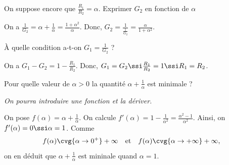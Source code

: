 \begin{enonce}
On suppose encore que $\frac{R_1}{R_2} = \alpha$. Exprimer $G_2$ en fonction de $\alpha$
\end{enonce}


\begin{corrige}
On a $\frac{1}{G_2} = \alpha + \frac{1}{\alpha} = \frac{1+\alpha^2}{\alpha}$. Donc, $G_2 = \frac{1}{\tfrac{1}{G_2}} = \frac{\alpha}{1+\alpha^2}$.
\end{corrige}





\begin{enonce}
  À quelle condition a-t-on $G_1 = \frac{1}{G_2}$ ?
\end{enonce}


\begin{corrige}
On a $G_1 - G_2 = 1-\frac{R_1}{R_2}$. Donc, $G_1=G_2 \ssi \frac{R_1}{R_2}=1 \ssi R_1 = R_2$.
\end{corrige}




\begin{enonce}
Pour quelle valeur de $\alpha>0$ la quantité $\alpha + \frac{1}{\alpha}$ est minimale ?\minusBigskip\minusSmallskip\par
{\itshape On pourra introduire une fonction et la dériver.}
\end{enonce}


\begin{corrige}
On pose $f(\alpha) = \alpha + \frac{1}{\alpha}$. On calcule $f'(\alpha) = 1- \frac{1}{\alpha^2} = \frac{\alpha^2-1}{\alpha^2}$. Ainsi, on $f'(\alpha) = 0 \ssi \alpha = 1$. Comme 
\[
f(\alpha) \cvg{\alpha \to 0^+} +\infty 
\quad
\text{et}
\quad
f(\alpha) \cvg{\alpha \to +\infty} +\infty, \vspace{-1.5mm}
\]
on en déduit que $\alpha + \frac{1}{\alpha}$ est mininale quand $\alpha = 1$.
\end{corrige}

